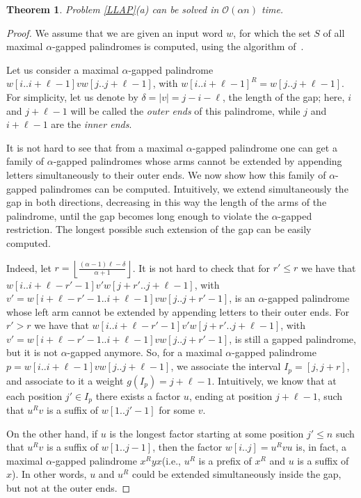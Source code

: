 \documentclass[final]{dmtcs-episciences}
\newcommand{\bigo}{{\mathcal O}}
\newtheorem{theorem}{Theorem}
\begin{document}
\begin{theorem}\label{proof_LLAP}
Problem \ref{LLAP}(a) can be solved in $\bigo(\alpha n)$ time.
\end{theorem}
\begin{proof}
We assume that we are given an input word $w$, for which the set $S$ of all maximal $\alpha$-gapped palindromes is computed, using the algorithm of~\cite{STACS2016}. 

Let us consider a maximal $\alpha$-gapped palindrome $w[i..i+\ell-1]vw[j..j+\ell-1]$, with $w[i..i+\ell-1]^R=w[j..j+\ell-1]$. For simplicity, let us denote by $\delta=|v|=j-i-\ell$, the length of the gap; here, $i$ and $j+\ell-1$ will be called the {\em outer ends} of this palindrome, while $j$ and $i+\ell-1$ are the {\em inner ends}. 

It is not hard to see that from a maximal $\alpha$-gapped palindrome one can get a family of $\alpha$-gapped palindromes whose arms cannot be extended by appending letters simultaneously to their outer ends. We now show how this family of $\alpha$-gapped palindromes can be computed. Intuitively, we extend simultaneously the gap in both directions, decreasing in this way the length of the arms of the palindrome, until the gap becomes long enough to violate the $\alpha$-gapped restriction. The longest possible such extension of the gap can be easily computed. 

Indeed, let $r=\left \lfloor \frac{(\alpha-1)\ell-\delta}{\alpha +1}\right\rfloor$. It is not hard to check that for $r'\leq r$ we have that $w[i..i+\ell-r'-1]v'w[j+r'..j+\ell-1]$, with $v'=w[i+\ell-r'-1..i+\ell-1]vw[j..j+r'-1]$, is an $\alpha$-gapped palindrome whose left arm cannot be extended by appending letters to their outer ends. For $r'>r$ we have that $w[i..i+\ell-r'-1]v'w[j+r'..j+\ell-1]$, with $v'=w[i+\ell-r'-1..i+\ell-1]vw[j..j+r'-1]$, is still a gapped palindrome, but it is not $\alpha$-gapped anymore.  So, for a maximal $\alpha$-gapped palindrome $p=w[i..i+\ell-1]vw[j..j+\ell-1]$, we associate the interval $I_p=[j,j+r]$, and associate to it a weight $g(I_p)=j+\ell-1$. Intuitively, we know that at each position $j'\in I_p$ there exists a factor $u$, ending at position $j+\ell-1$, such that $u^Rv$ is a suffix of $w[1..j'-1]$ for some $v$. 

On the other hand, if $u$ is the longest factor starting at some position $j'\leq n$ such that $u^Rv$ is a suffix of $w[1..j-1]$, then the factor $w[i..j]=u^Rvu$ is, in fact, a maximal $\alpha$-gapped palindrome $x^Ryx$(i.e., $u^R$ is a prefix of $x^R$ and $u$ is a suffix of $x$). In other words, $u$ and $u^R$ could be extended simultaneously inside the gap, but not at the outer ends.


\end{proof}
\end{document}

